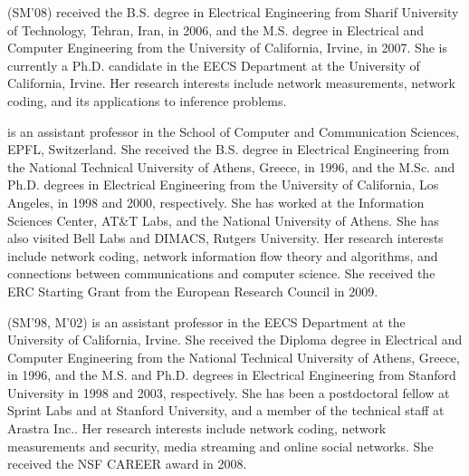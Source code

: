 



 (SM'08) received the B.S. degree in Electrical Engineering from Sharif University of Technology, Tehran, Iran, in 2006, and the M.S. degree in Electrical and Computer Engineering from the University of California, Irvine, in 2007. She is currently a Ph.D. candidate in the EECS Department at the University of California, Irvine. Her research interests include network measurements, network coding, and its applications to inference problems. 

 is an assistant professor in the School of Computer and Communication Sciences, EPFL, Switzerland. She received the B.S. degree in Electrical Engineering from the National Technical University of Athens, Greece, in 1996, and the M.Sc. and Ph.D. degrees in Electrical Engineering from the University of California, Los Angeles, in 1998 and 2000, respectively. She has worked at the Information Sciences Center, AT\&T Labs, and the National University of Athens. She has also visited Bell Labs and DIMACS, Rutgers University. Her research interests include network coding, network information flow theory and algorithms, and connections between communications and computer science. She received the ERC Starting Grant from the European Research Council in 2009.


 (SM'98, M'02) is an assistant professor in the EECS Department at the University of California, Irvine. She received the Diploma degree in Electrical and Computer Engineering from the National Technical University of Athens, Greece, in 1996, and the M.S. and Ph.D. degrees in Electrical Engineering from Stanford University in 1998 and 2003, respectively. She has been a postdoctoral fellow at Sprint Labs and at Stanford University, and a member of the technical staff at Arastra Inc.. Her research interests include network coding, network measurements and security, media streaming and online social networks. She received the NSF CAREER award in 2008.

